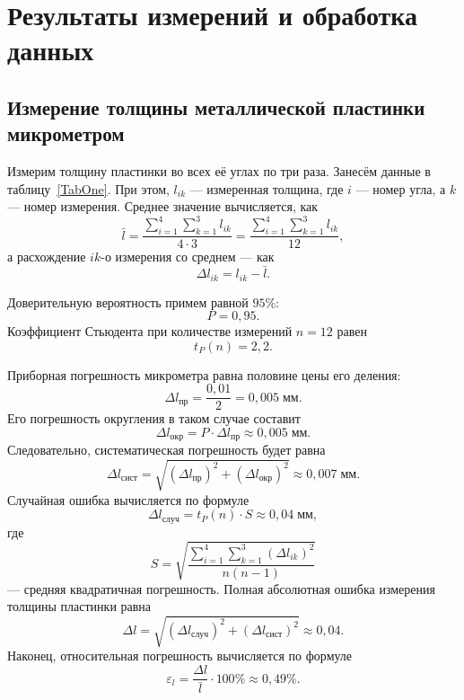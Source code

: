 \section{Результаты измерений и обработка данных}

\subsection{Измерение толщины металлической пластинки микрометром}

Измерим толщину пластинки во всех её углах по три раза. Занесём данные в таблицу~\ref{TabOne}. При этом, $l_{ik}$ --- измеренная толщина, где $i$ --- номер угла, а $k$ --- номер измерения. Среднее значение вычисляется, как
\[
\bar l=\frac{\displaystyle\sum_{i=1}^{4}\displaystyle\sum_{k=1}^{3}l_{ik}}{4\cdot3}=\frac{\displaystyle\sum_{i=1}^{4}\displaystyle\sum_{k=1}^{3}l_{ik}}{12},
\]
а расхождение $ik$-о измерения со среднем --- как
\[
\Delta l_{ik}=l_{ik}-\bar l.
\]

Доверительную вероятность примем равной $95\%$:
\[
P=0{,}95.
\]
Коэффициент Стьюдента при количестве измерений $n=12$ равен
\[
t_P(n)=2{,}2.
\]

Приборная погрешность микрометра равна половине цены его деления:
\[
\Delta l_\text{пр}=\frac{0{,}01}{2}=0{,}005\;\text{мм}.
\]
Его погрешность округления в таком случае составит
\[
\Delta l_\text{окр}=P\cdot\Delta l_\text{пр}\approx0{,}005\;\text{мм}.
\]
Следовательно, систематическая погрешность будет равна
\[
\Delta l_\text{сист}=\sqrt{(\Delta l_\text{пр})^2+(\Delta l_\text{окр})^2}\approx0{,}007\;\text{мм}.
\]
Случайная ошибка вычисляется по формуле
\[
\Delta l_\text{случ}=t_P(n)\cdot S\approx0{,}04\;\text{мм},
\]
где
\[
S=\sqrt{\frac{\displaystyle\sum_{i=1}^{4}\displaystyle\sum_{k=1}^{3}(\Delta l_{ik})^2}{n(n-1)}}
\]
--- средняя квадратичная погрешность. Полная абсолютная ошибка измерения толщины пластинки равна
\[
\Delta l=\sqrt{(\Delta l_\text{случ})^2+(\Delta l_\text{сист})^2}\approx0{,}04.
\]
Наконец, относительная погрешность вычисляется по формуле
\[
\varepsilon_l=\frac{\Delta l}{\bar l}\cdot100\%\approx0{,}49\%.
\]

